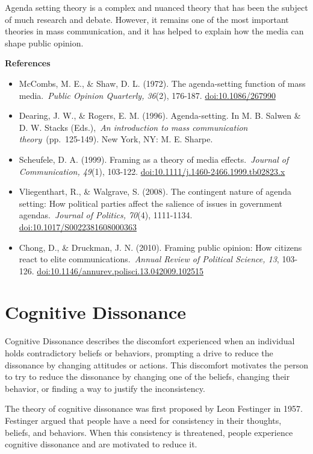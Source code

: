 \documentclass[
]{book}
\begin{document}
Agenda setting theory is a complex and nuanced theory that has been the subject of much research and debate. However, it remains one of the most important theories in mass communication, and it has helped to explain how the media can shape public opinion.

\textbf{References}

\begin{itemize}
\item
  McCombs, M. E., \& Shaw, D. L. (1972). The agenda-setting function of mass media.~\emph{Public Opinion Quarterly, 36}(2), 176-187. \url{doi:10.1086/267990}
\item
  Dearing, J. W., \& Rogers, E. M. (1996). Agenda-setting. In M. B. Salwen \& D. W. Stacks (Eds.),~\emph{An introduction to mass communication theory}~(pp.~125-149). New York, NY: M. E. Sharpe.
\item
  Scheufele, D. A. (1999). Framing as a theory of media effects.~\emph{Journal of Communication, 49}(1), 103-122. \url{doi:10.1111/j.1460-2466.1999.tb02823.x}
\item
  Vliegenthart, R., \& Walgrave, S. (2008). The contingent nature of agenda setting: How political parties affect the salience of issues in government agendas.~\emph{Journal of Politics, 70}(4), 1111-1134. \url{doi:10.1017/S0022381608000363}
\item
  Chong, D., \& Druckman, J. N. (2010). Framing public opinion: How citizens react to elite communications.~\emph{Annual Review of Political Science, 13}, 103-126. \url{doi:10.1146/annurev.polisci.13.042009.102515}
\end{itemize}

\section{Cognitive Dissonance}\label{cognitive-dissonance}

Cognitive Dissonance describes the discomfort experienced when an individual holds contradictory beliefs or behaviors, prompting a drive to reduce the dissonance by changing attitudes or actions. This discomfort motivates the person to try to reduce the dissonance by changing one of the beliefs, changing their behavior, or finding a way to justify the inconsistency.

The theory of cognitive dissonance was first proposed by Leon Festinger in 1957. Festinger argued that people have a need for consistency in their thoughts, beliefs, and behaviors. When this consistency is threatened, people experience cognitive dissonance and are motivated to reduce it.
\end{document}
